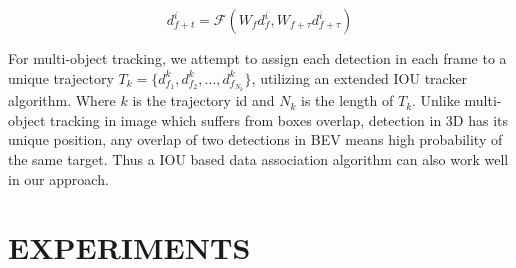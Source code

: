 \documentclass[letterpaper, 10 pt, conference]{ieeeconf}  %
\begin{document}

\begin{equation}
d^i_{f+t} = \mathcal{F}(W_f d^i_f, W_{f+\tau} d^i_{f+\tau}) \label{con:interpolation}
\end{equation}


For multi-object tracking, we attempt to assign each detection in each frame to a unique trajectory $T_k = \{d^k_{f_1}, d^k_{f_2}, ..., d^k_{f_{N_k}}\}$, utilizing an extended IOU tracker algorithm\cite{bochinski2018extending}. Where $k$ is the trajectory id and $N_k$ is the length of $T_k$. Unlike multi-object tracking in image which suffers from boxes overlap, detection in 3D has its unique position, any overlap of two detections in BEV means high probability of the same target. Thus a IOU based data association algorithm can also work well in our approach.


\section{EXPERIMENTS}
\end{document}
